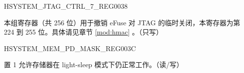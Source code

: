 \begin{register}{H}{SYSTEM\_JTAG\_CTRL\_7\_REG}{\hexprefix{}0038}\label{regdesc:SYSTEMJTAGCTRL7REG}
%
\regnewline%
\begin{regdesc}\begin{reglist}
\label{fielddesc:SYSTEMCANCELEFUSEDISABLEJTAGTEMPORARY7}\item [SYSTEM\_CANCEL\_EFUSE\_DISABLE\_JTAG\_TEMPORARY\_7] 本组寄存器（共 256 位）用于撤销 eFuse 对 JTAG 的临时关闭，本寄存器为第 224 到 255 位。具体请见章节 \ref{mod:hmac} \textit{}。（只写）
\end{reglist}\end{regdesc}
\end{register}


\begin{register}{H}{SYSTEM\_MEM\_PD\_MASK\_REG}{\hexprefix{}003C}\label{regdesc:SYSTEMMEMPDMASKREG}
%
%
\regnewline%
\begin{regdesc}\begin{reglist}
\label{fielddesc:SYSTEMLSLPMEMPDMASK}\item [SYSTEM\_LSLP\_MEM\_PD\_MASK] 置 1 允许存储器在 light-sleep 模式下仍正常工作。（读/写）
\end{reglist}\end{regdesc}
\end{register}


